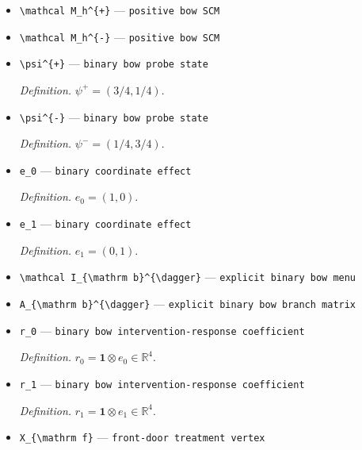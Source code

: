 \documentclass{article}
\begin{document}
\begin{itemize}
  \item \texttt{\textbackslash{}\allowbreak{}mathcal M\_\allowbreak{}h\textasciicircum{}\{+\allowbreak{}\}\allowbreak{}} --- \texttt{positive bow SCM}
  \item \texttt{\textbackslash{}\allowbreak{}mathcal M\_\allowbreak{}h\textasciicircum{}\{-\allowbreak{}\}\allowbreak{}} --- \texttt{positive bow SCM}
  \item \texttt{\textbackslash{}\allowbreak{}psi\textasciicircum{}\{+\allowbreak{}\}\allowbreak{}} --- \texttt{binary bow probe state}
  \par\smallskip\noindent\emph{Definition.} \(\psi^{+}=(3/4,1/4)\).
  \item \texttt{\textbackslash{}\allowbreak{}psi\textasciicircum{}\{-\allowbreak{}\}\allowbreak{}} --- \texttt{binary bow probe state}
  \par\smallskip\noindent\emph{Definition.} \(\psi^{-}=(1/4,3/4)\).
  \item \texttt{e\_\allowbreak{}0} --- \texttt{binary coordinate effect}
  \par\smallskip\noindent\emph{Definition.} \(e_0=(1,0)\).
  \item \texttt{e\_\allowbreak{}1} --- \texttt{binary coordinate effect}
  \par\smallskip\noindent\emph{Definition.} \(e_1=(0,1)\).
  \item \texttt{\textbackslash{}\allowbreak{}mathcal I\_\allowbreak{}\{\textbackslash{}\allowbreak{}mathrm b\}\allowbreak{}\textasciicircum{}\{\textbackslash{}\allowbreak{}dagger\}\allowbreak{}} --- \texttt{explicit binary bow menu}
  \item \texttt{A\_\allowbreak{}\{\textbackslash{}\allowbreak{}mathrm b\}\allowbreak{}\textasciicircum{}\{\textbackslash{}\allowbreak{}dagger\}\allowbreak{}} --- \texttt{explicit binary bow branch matrix}
  \item \texttt{r\_\allowbreak{}0} --- \texttt{binary bow intervention-\allowbreak{}response coefficient}
  \par\smallskip\noindent\emph{Definition.} \(r_0=\mathbf 1\otimes e_0\in\mathbb R^4\).
  \item \texttt{r\_\allowbreak{}1} --- \texttt{binary bow intervention-\allowbreak{}response coefficient}
  \par\smallskip\noindent\emph{Definition.} \(r_1=\mathbf 1\otimes e_1\in\mathbb R^4\).
  \item \texttt{X\_\allowbreak{}\{\textbackslash{}\allowbreak{}mathrm f\}\allowbreak{}} --- \texttt{front-\allowbreak{}door treatment vertex}

\end{itemize}
\end{document}
